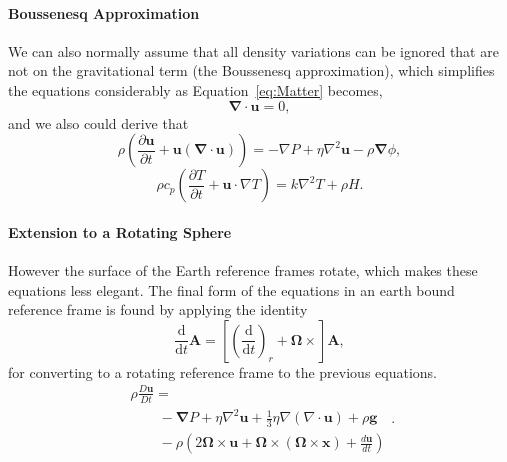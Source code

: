 \paragraph{Boussenesq Approximation}
We can also normally assume that all density variations can be ignored that
 are not on the gravitational term (the Boussenesq approximation),
  which simplifies the equations considerably as Equation~\ref{eq:Matter} becomes,
\begin{equation}
    \boldsymbol{\nabla}\cdot\mathbf{u} = 0, \tag{B-Matter}
\end{equation}
and we also could derive that
\begin{equation}
\rho\left (\frac{\partial \mathbf{u}}{\partial t}
+ \mathbf{u}(\boldsymbol{\nabla}\cdot \mathbf{u})\right)=
-\nabla P+\eta \nabla^{2} \mathbf{u}-\rho \boldsymbol{\nabla}\phi, \tag{B-Momentum}
\end{equation}
\begin{equation}
\rho c_{p}\left(\frac{\partial T}{\partial t}
+\mathbf{u} \cdot \nabla T\right)=k \nabla^{2} T+\rho H. \tag{B-Energy}
\end{equation}

\paragraph{Extension to a Rotating Sphere}
\label{app:rotating_equations}
However the surface of the Earth reference frames rotate,
 which makes these equations less elegant.
  The final form of the equations in an earth bound reference frame
  is found by applying the identity
\begin{equation}
\frac{\mathrm{d}}{\mathrm{d} t} \boldsymbol{A}=
\left[\left(\frac{\mathrm{d}}{\mathrm{d} t}\right)_{r}
+\mathbf{\Omega} \times\right] \boldsymbol{A},
\end{equation}
for converting to a rotating reference frame to the previous equations.
\begin{equation}
\begin{array}{l}
\rho \frac{D \mathbf{u}}{D t}=\\\quad\quad-\boldsymbol{\nabla} P+
\eta \nabla^{2} \mathbf{u}+\frac{1}{3} \eta \nabla(\nabla \cdot \mathbf{u})
+\rho \mathbf{g}\\\quad\quad-\rho\left(2 \mathbf{\Omega} \times \mathbf{u}
+\mathbf{\Omega} \times(\mathbf{\Omega} \times \mathbf{x})
+\frac{d \mathbf{u}}{d t}\right)\end{array}.
\tag{R-Momentum}
\end{equation}

